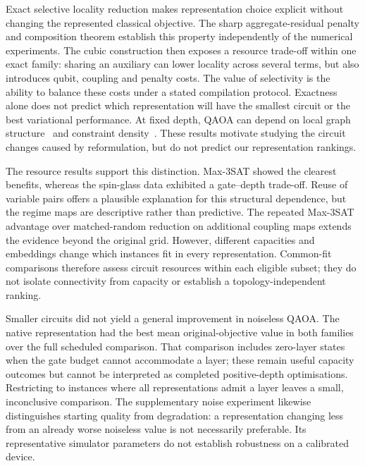 \documentclass[a4paper,onecolumn,11pt,unpublished]{quantumarticle}
\theoremstyle{remark}
\begin{document}
Exact selective locality reduction makes representation choice explicit
without changing the represented classical objective. The sharp
aggregate-residual penalty and composition theorem establish this property
independently of the numerical experiments. The cubic construction then
exposes a resource trade-off within one exact family: sharing an auxiliary
can lower locality across several terms, but also introduces qubit, coupling
and penalty costs. The value of selectivity is the ability to balance these
costs under a stated compilation protocol. Exactness alone does not predict
which representation will have the smallest circuit or the best variational
performance. At fixed depth, QAOA can depend on local graph
structure~\cite{WangMaxCut2018,FarhiLocal2020} and constraint
density~\cite{Akshay2020}. These results motivate studying the circuit
changes caused by reformulation, but do not predict our representation
rankings.

The resource results support this distinction. Max-3SAT showed the clearest
benefits, whereas the spin-glass data exhibited a gate--depth trade-off.
Reuse of variable pairs offers a plausible explanation for this structural
dependence, but the regime maps are descriptive rather than predictive.
The repeated Max-3SAT advantage over matched-random reduction on additional
coupling maps extends the evidence beyond the original grid. However,
different capacities and embeddings change which instances fit in every
representation. Common-fit comparisons therefore assess circuit resources
within each eligible subset; they do not isolate connectivity from capacity
or establish a topology-independent ranking.

Smaller circuits did not yield a general improvement in noiseless QAOA.
The native representation had the best mean original-objective value in both
families over the full scheduled comparison. That comparison includes
zero-layer states when the gate budget cannot accommodate a layer; these
remain useful capacity outcomes but cannot be interpreted as completed
positive-depth optimisations. Restricting to instances where all
representations admit a layer leaves a small, inconclusive comparison.
The supplementary noise experiment likewise distinguishes starting quality
from degradation: a representation changing less from an already worse
noiseless value is not necessarily preferable. Its representative simulator
parameters do not establish robustness on a calibrated device.
\end{document}

